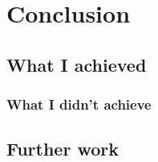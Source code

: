 \chapter{Conclusion}
  \section{What I achieved}
    \subsection{What I didn't achieve}
    
  \section{Further work}